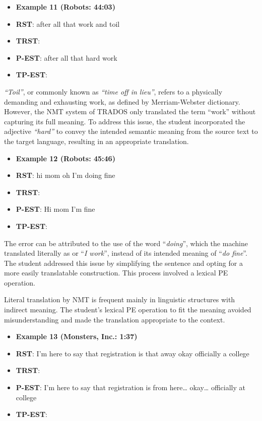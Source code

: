 \documentclass[english]{textolivre}
\begin{document}
\begin{itemize}
\item \textbf{Example 11 (Robots: 44:03)}
\item \textbf{RST}: after all that work and toil
\item \textbf{TRST}: 
\item \textbf{P-EST}: after all that hard work
\item \textbf{TP-EST}: 
\end{itemize}

\emph{“Toil”}, or commonly known as \emph{“time off in lieu”}, refers to a physically demanding and exhausting work, as defined by Merriam-Webster dictionary. However, the NMT system of TRADOS only translated the term “work” without capturing its full meaning. To address this issue, the student incorporated the adjective \emph{“hard”} to convey the intended semantic meaning from the source text to the target language, resulting in an appropriate translation.

\begin{itemize}
\item \textbf{Example 12 (Robots: 45:46)}
\item \textbf{RST}: hi mom oh I’m doing fine
\item \textbf{TRST}: 
\item \textbf{P-EST}: Hi mom I'm fine
\item \textbf{TP-EST}: 
\end{itemize}

The error can be attributed to the use of the word “\emph{doing}”, which the machine translated literally as  or “\emph{I work}”, instead of its intended meaning of “\emph{do fine}”. The student addressed this issue by simplifying the sentence and opting for a more easily translatable construction. This process involved a lexical PE operation.

Literal translation by NMT is frequent mainly in linguistic structures with indirect meaning. The student’s lexical PE operation to fit the meaning avoided misunderstanding and made the translation appropriate to the context.

\begin{itemize}
\item \textbf{Example 13 (Monsters, Inc.: 1:37)}
\item \textbf{RST}: I’m here to say that registration is that away okay officially a college
\item \textbf{TRST}: 
\item \textbf{P-EST}: I’m here to say that registration is from here… okay… officially at college
\item \textbf{TP-EST}: 
\end{itemize}
\end{document}
